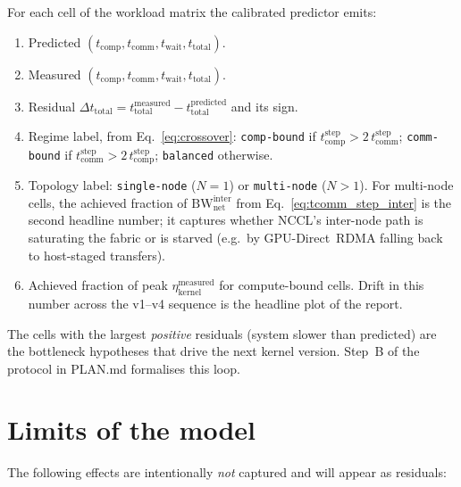 \documentclass[11pt]{article}
\newcommand{\bw}{\mathrm{BW}}
\newcommand{\comp}{\mathrm{comp}}
\newcommand{\comm}{\mathrm{comm}}
\newcommand{\wait}{\mathrm{wait}}
\newcommand{\tot}{\mathrm{total}}
\newcommand{\step}{\mathrm{step}}
\begin{document}
For each cell of the workload matrix the calibrated predictor emits:
\begin{enumerate}
  \item Predicted $(t_\comp, t_\comm, t_\wait, t_\tot)$.
  \item Measured $(t_\comp, t_\comm, t_\wait, t_\tot)$.
  \item Residual $\Delta t_\tot = t_\tot^{\text{measured}} -
        t_\tot^{\text{predicted}}$ and its sign.
  \item Regime label, from Eq.~\eqref{eq:crossover}:
        \texttt{comp-bound} if $t_\comp^\step > 2\,t_\comm^\step$;
        \texttt{comm-bound} if $t_\comm^\step > 2\,t_\comp^\step$;
        \texttt{balanced} otherwise.
  \item Topology label: \texttt{single-node} ($N=1$) or
        \texttt{multi-node} ($N>1$). For multi-node cells, the
        achieved fraction of $\bw_{\text{net}}^{\text{inter}}$ from
        Eq.~\eqref{eq:tcomm_step_inter} is the second headline number;
        it captures whether NCCL's inter-node path is saturating the
        fabric or is starved (e.g.~by GPU-Direct~RDMA falling back to
        host-staged transfers).
  \item Achieved fraction of peak $\eta_{\text{kernel}}^{\text{measured}}$
        for compute-bound cells. Drift in this number across the v1--v4
        sequence is the headline plot of the report.
\end{enumerate}

The cells with the largest \emph{positive} residuals (system slower
than predicted) are the bottleneck hypotheses that drive the next
kernel version. Step~B of the protocol in PLAN.md formalises this loop.

\section{Limits of the model}
\label{sec:limits}

The following effects are intentionally \emph{not} captured and will
appear as residuals:
\end{document}
